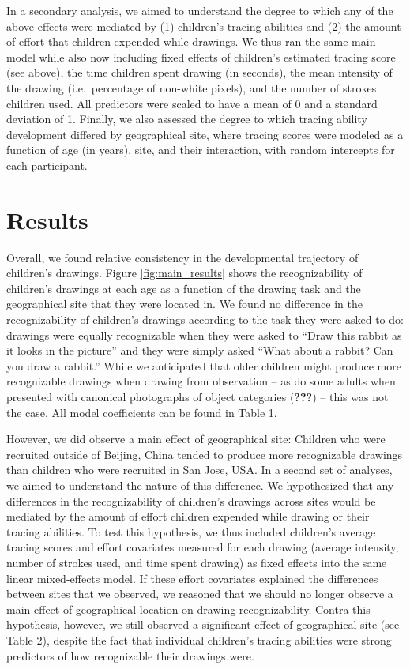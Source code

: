 \documentclass[
  english,
  man]{apa6}
\begin{document}
In a secondary analysis, we aimed to understand the degree to which any of the above effects were mediated by (1) children's tracing abilities and (2) the amount of effort that children expended while drawings. We thus ran the same main model while also now including fixed effects of children's estimated tracing score (see above), the time children spent drawing (in seconds), the mean intensity of the drawing (i.e.~percentage of non-white pixels), and the number of strokes children used. All predictors were scaled to have a mean of 0 and a standard deviation of 1. Finally, we also assessed the degree to which tracing ability development differed by geographical site, where tracing scores were modeled as a function of age (in years), site, and their interaction, with random intercepts for each participant.

\hypertarget{results}{%
\section{Results}\label{results}}

Overall, we found relative consistency in the developmental trajectory of children's drawings. Figure \ref{fig:main_results} shows the recognizability of children's drawings at each age as a function of the drawing task and the geographical site that they were located in. We found no difference in the recognizability of children's drawings according to the task they were asked to do: drawings were equally recognizable when they were asked to \enquote{Draw this rabbit as it looks in the picture} and they were simply asked \enquote{What about a rabbit? Can you draw a rabbit.} While we anticipated that older children might produce more recognizable drawings when drawing from observation -- as do some adults when presented with canonical photographs of object categories ({\textbf{???}}) -- this was not the case. All model coefficients can be found in Table 1.

However, we did observe a main effect of geographical site: Children who were recruited outside of Beijing, China tended to produce more recognizable drawings than children who were recruited in San Jose, USA. In a second set of analyses, we aimed to understand the nature of this difference. We hypothesized that any differences in the recognizability of children's drawings across sites would be mediated by the amount of effort children expended while drawing or their tracing abilities. To test this hypothesis, we thus included children's average tracing scores and effort covariates measured for each drawing (average intensity, number of strokes used, and time spent drawing) as fixed effects into the same linear mixed-effects model. If these effort covariates explained the differences between sites that we observed, we reasoned that we should no longer observe a main effect of geographical location on drawing recognizability. Contra this hypothesis, however, we still observed a significant effect of geographical site (see Table 2), despite the fact that individual children's tracing abilities were strong predictors of how recognizable their drawings were.
\end{document}
